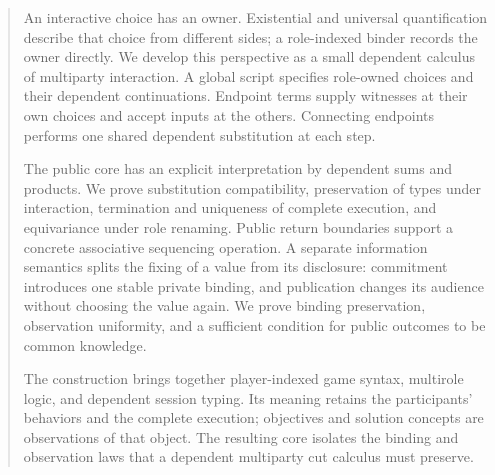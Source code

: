 \begin{abstract}
An interactive choice has an owner. Existential and universal quantification
describe that choice from different sides; a role-indexed binder records the
owner directly. We develop this perspective as a small dependent calculus of
multiparty interaction. A global script specifies role-owned choices and their
dependent continuations. Endpoint terms supply witnesses at their own choices
and accept inputs at the others. Connecting endpoints performs one shared
dependent substitution at each step.

The public core has an explicit interpretation by dependent sums and products.
We prove substitution compatibility, preservation of types under interaction,
termination and uniqueness of complete execution, and equivariance under role
renaming. Public return boundaries support a concrete associative sequencing
operation. A separate information semantics splits the fixing of a value from
its disclosure: commitment introduces one stable private binding, and
publication changes its audience without choosing the value again. We prove
binding preservation, observation uniformity, and a sufficient condition for
public outcomes to be common knowledge.

The construction brings together player-indexed game syntax, multirole logic,
and dependent session typing. Its meaning retains the participants' behaviors
and the complete execution; objectives and solution concepts are observations
of that object. The resulting core isolates the binding and observation laws
that a dependent multiparty cut calculus must preserve.
\end{abstract}
